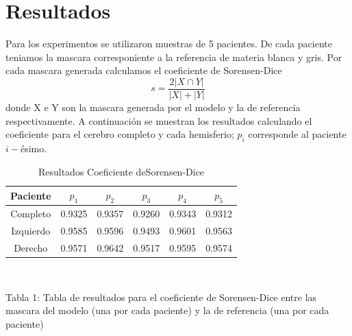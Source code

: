 \documentclass[conference]{IEEEtran}
\begin{document}
\section{Resultados}
Para los experimentos se utilizaron muestras de 5 pacientes. De cada paciente teniamos la mascara corresponiente a la referencia de materia blanca y gris. Por cada mascara generada calculamos el coeficiente de Sorensen-Dice
\begin{equation}
s = \frac{2|X \cap Y|}{|X| + |Y|}
\end{equation}
donde X e Y son la mascara generada por el modelo y la de referencia respectivamente. A continuación se muestran los resultados calculando el coeficiente para el cerebro completo y cada hemisferio; $p_i$ corresponde al paciente $i-$ésimo.

\begin{table}
\caption{Resultados Coeficiente deSorensen-Dice }
\begin{center}
\begin{tabular}{|c|c|c|c|c|c|}
\hline 
Paciente & $p_1$ & $p_2$ & $p_3$ & $p_4$ & $p_5$ \\ 
\hline 
\hline
Completo &  0.9325 & 0.9357 & 0.9260 & 0.9343 & 0.9312 \\ 
\hline 
Izquierdo & 0.9585 & 0.9596 & 0.9493 & 0.9601 & 0.9563 \\ 
\hline 
Derecho & 0.9571 & 0.9642 & 0.9517 & 0.9595 & 0.9574 \\ 
\hline 
\end{tabular}\\
\end{center} 
{\footnotesize Tabla 1: Tabla de resultados para el coeficiente de Sorensen-Dice entre las mascara del modelo (una por cada paciente) y la de referencia (una por cada paciente)}
\end{table}
\end{document}
